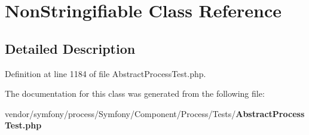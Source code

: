 \section{Non\+Stringifiable Class Reference}
\label{class_symfony_1_1_component_1_1_process_1_1_tests_1_1_non_stringifiable}


\subsection{Detailed Description}


Definition at line 1184 of file Abstract\+Process\+Test.\+php.



The documentation for this class was generated from the following file\+:\begin{DoxyCompactItemize}
\item 
vendor/symfony/process/\+Symfony/\+Component/\+Process/\+Tests/{\bf Abstract\+Process\+Test.\+php}\end{DoxyCompactItemize}
